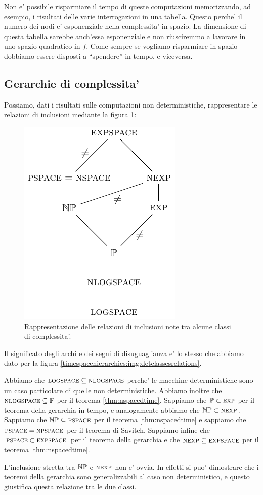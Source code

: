 Non e' possibile risparmiare il tempo di queste computazioni memorizzando, ad esempio, i risultati
delle varie interrogazioni in una tabella. Questo perche' il numero dei nodi e' esponenziale nella
complessita' in spazio. La dimensione di questa tabella sarebbe anch'essa esponenziale e non
riusciremmo a lavorare in uno spazio quadratico in $f$. Come sempre se vogliamo risparmiare in
spazio dobbiamo essere disposti a ``spendere'' in tempo, e viceversa.

\subsection{Gerarchie di complessita'}

Possiamo, dati i risultati sulle computazioni non deterministiche, rappresentare le relazioni di
inclusioni mediante la figura \ref{nondeterminism:img:complexity_hierarchy}:

\begin{figure}[h]
    \begin{center}
        \includegraphics{./img/nondeterminism/Hierarchies.pdf}
        \caption{Rappresentazione delle relazioni di inclusioni note tra alcune classi di
        complessita'.}
        \label{nondeterminism:img:complexity_hierarchy}
    \end{center}
\end{figure}

Il significato degli archi e dei segni di disuguaglianza e' lo stesso che abbiamo dato per la figura
\ref{timespacehierarchies:img:detclassesrelations}.

Abbiamo che $\textsc{logspace} \subseteq \textsc{nlogspace}$ perche' le macchine deterministiche sono un caso
particolare di quelle non deterministiche. Abbiamo inoltre che $\textsc{nlogspace} \subseteq \mathbb{P}$ per il
teorema \ref{thm:nspacedtime}. Sappiamo che $\mathbb{P} \subset \textsc{exp}$ per il teorema della gerarchia in
tempo, e analogamente abbiamo che $\mathbb{NP} \subset \textsc{nexp}$. Sappiamo che $\mathbb{NP} \subseteq \textsc{pspace}$
per il teorema \ref{thm:nspacedtime} e sappiamo che $\textsc{pspace} = \textsc{npspace}$ per il teorema di Savitch.
Sappiamo infine che $\textsc{pspace} \subset \textsc{expspace}$ per il teorema della gerarchia e che $\textsc{nexp}
\subseteq \textsc{expspace}$ per il teorema \ref{thm:nspacedtime}.

L'inclusione stretta tra $\mathbb{NP}$ e $\textsc{nexp}$ non e' ovvia. In effetti si puo' dimostrare che i
teoremi della gerarchia sono generalizzabili al caso non deterministico, e questo giustifica questa
relazione tra le due classi.
